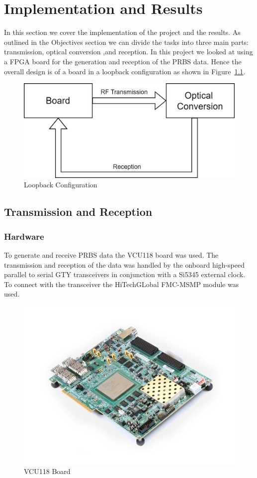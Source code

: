 \chapter{Implementation and Results}
In this section we cover the implementation of the project and the results.
As outlined in the Objectives section we can divide the tasks into three main
parts: transmission, optical conversion ,and reception. 
In this project we looked at using a FPGA board for the generation and
reception of the PRBS data.  Hence the overall design is of a board in a
loopback configuration as shown in Figure~\ref{fig:loopback}.

\begin{figure}[ht]
    \centering
    \includegraphics[width=0.5\linewidth]{img/loopback.png}
    \caption{Loopback Configuration}%
    \label{fig:loopback}
\end{figure}

\section{Transmission and Reception}%
\label{sec:transmission_and_reception}

\subsection{Hardware}%
\label{sub:hardware}
To generate and receive PRBS data the VCU118 board was used. The transmission
and reception of the data was handled by the onboard high-speed parallel to
serial GTY transceivers in conjunction with a Si5345 external clock. To connect
with the transceiver the HiTechGLobal FMC-MSMP module was used.
\begin{figure}[ht]
    \centering
    \includegraphics[width=0.5\linewidth]{img/board.jpg}
    \caption{VCU118 Board}%
    \label{fig:board}
\end{figure}

